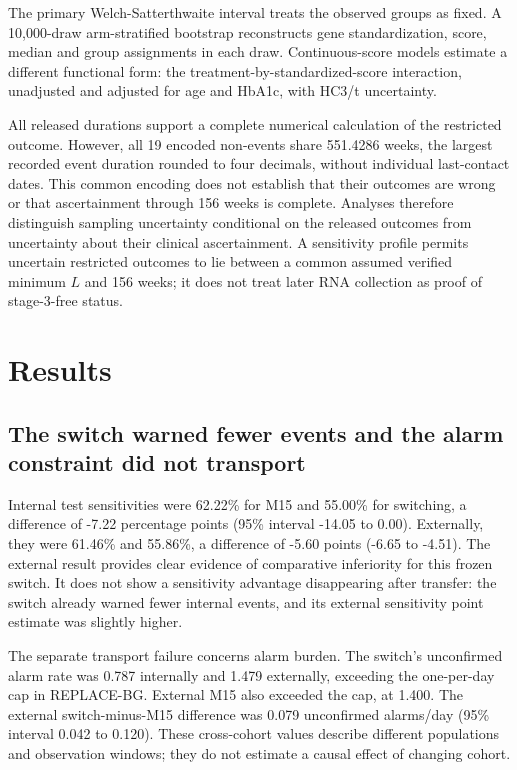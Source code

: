 \documentclass[
  american,
  11pt,
  letterpaper,
]{article}
\begin{document}
The primary Welch-Satterthwaite interval treats the observed groups as
fixed. A 10,000-draw arm-stratified bootstrap reconstructs gene
standardization, score, median and group assignments in each draw.
Continuous-score models estimate a different functional form: the
treatment-by-standardized-score interaction, unadjusted and adjusted for
age and HbA1c, with HC3/t uncertainty.

All released durations support a complete numerical calculation of the
restricted outcome. However, all 19 encoded non-events share 551.4286
weeks, the largest recorded event duration rounded to four decimals,
without individual last-contact dates. This common encoding does not
establish that their outcomes are wrong or that ascertainment through
156 weeks is complete. Analyses therefore distinguish sampling
uncertainty conditional on the released outcomes from uncertainty about
their clinical ascertainment. A sensitivity profile permits uncertain
restricted outcomes to lie between a common assumed verified minimum
\(L\) and 156 weeks; it does not treat later RNA collection as proof of
stage-3-free status.

\section{Results}\label{results}

\subsection{The switch warned fewer events and the alarm constraint did
not
transport}\label{the-switch-warned-fewer-events-and-the-alarm-constraint-did-not-transport}

Internal test sensitivities were 62.22\% for M15 and 55.00\% for
switching, a difference of \mbox{-7.22} percentage points (95\% interval \mbox{-14.05}
to 0.00). Externally, they were 61.46\% and 55.86\%, a difference of
\mbox{-5.60} points (\mbox{-6.65} to \mbox{-4.51}). The external result provides clear
evidence of comparative inferiority for this frozen switch. It does not
show a sensitivity advantage disappearing after transfer: the switch
already warned fewer internal events, and its external sensitivity point
estimate was slightly higher.

The separate transport failure concerns alarm burden. The switch's
unconfirmed alarm rate was 0.787 internally and 1.479 externally,
exceeding the one-per-day cap in REPLACE-BG. External M15 also exceeded
the cap, at 1.400. The external switch-minus-M15 difference was 0.079
unconfirmed alarms/day (95\% interval 0.042 to 0.120). These
cross-cohort values describe different populations and observation
windows; they do not estimate a causal effect of changing cohort.
\end{document}
